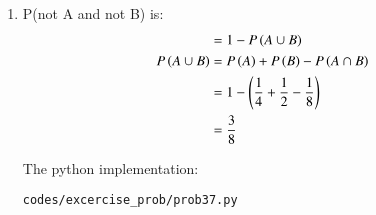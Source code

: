 \renewcommand{\theequation}{\theenumi}

\begin{enumerate}

\item P(not A and not B) is:
\begin{align*}
&= 1-P\left(A \cup B\right)\\
P\left(A \cup B\right) &= P\left(A\right) + P\left(B\right) - P\left(A \cap B\right)\\
&= 1-\left(\frac{1}{4} + \frac{1}{2} - \frac{1}{8}\right)\\
&= \frac{3}{8}
\end{align*}

The python implementation:
\begin{lstlisting}
codes/excercise_prob/prob37.py
\end{lstlisting}

\end{enumerate}
